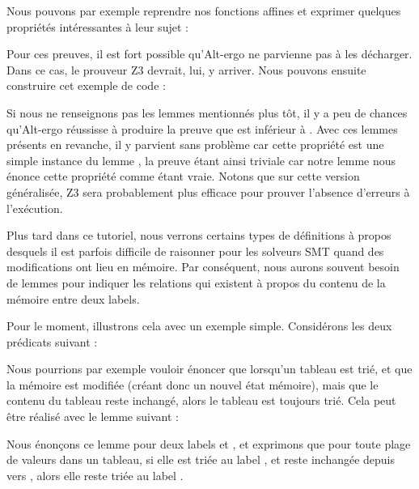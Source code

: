 

Nous pouvons par exemple reprendre nos fonctions affines et exprimer quelques 
propriétés intéressantes à leur sujet :






Pour ces preuves, il est fort possible qu'Alt-ergo ne parvienne pas à les 
décharger. Dans ce cas, le prouveur Z3 devrait, lui, y arriver. Nous pouvons 
ensuite construire cet exemple de code :






Si nous ne renseignons pas les lemmes mentionnés plus tôt, il y a peu de chances 
qu'Alt-ergo réussisse à produire la preuve que  est inférieur à .
Avec ces lemmes présents en revanche, il y parvient sans problème car cette 
propriété est une simple instance du lemme , la preuve 
étant ainsi triviale car notre lemme nous énonce cette propriété comme étant vraie.
Notons que sur cette version généralisée, Z3 sera probablement plus efficace pour
prouver l'absence d'erreurs à l'exécution.





Plus tard dans ce tutoriel, nous verrons certains types de définitions à propos
desquels il est parfois difficile de raisonner pour les solveurs SMT quand des
modifications ont lieu en mémoire. Par conséquent, nous aurons souvent besoin de
lemmes pour indiquer les relations qui existent à propos du contenu de la mémoire
entre deux labels.


Pour le moment, illustrons cela avec un exemple simple. Considérons les deux
prédicats suivant :




Nous pourrions par exemple vouloir énoncer que lorsqu'un tableau est trié, et que
la mémoire est modifiée (créant donc un nouvel état mémoire), mais que le contenu du
tableau reste inchangé, alors le tableau est toujours trié. Cela peut être réalisé
avec le lemme suivant :




Nous énonçons ce lemme pour deux labels  et , et
exprimons que pour toute plage de valeurs dans un tableau, si elle est triée au label
, et reste inchangée depuis  vers ,
alors elle reste triée au label .



